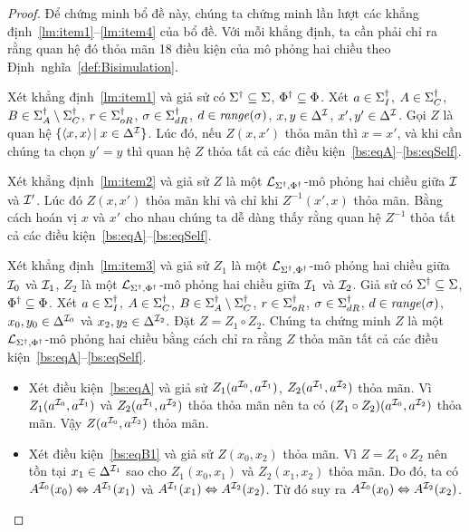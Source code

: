\begin{proof}
	Để chứng minh bổ đề này, chúng ta chứng minh lần lượt các khẳng định~\ref{lm:item1}--\ref{lm:item4} của bổ đề. Với mỗi khẳng định, ta cần phải chỉ ra rằng quan hệ đó thỏa mãn 18 điều kiện của mô phỏng hai chiều theo Định~nghĩa~\ref{def:Bisimulation}.
	
	\semiItem Xét khẳng định~\eqref{lm:item1} và giả sử có $\Sigma^\dag \subseteq \Sigma$, $\Phi^\dag \subseteq \Phi$. Xét $a \in \Sigma^\dag_I$, $A \in \Sigma^\dag_C$, $B \in \Sigma^\dag_A\setminus\Sigma^\dag_C$, $r \in \Sigma^\dag_{oR}$, $\sigma \in \Sigma^\dag_{dR}$, $d \in \mathit{range}(\sigma)$, $x,y \in \Delta^{\mathcal{I}}$, $x',y' \in \Delta^{\mathcal{I}}$.
	Gọi $Z$ là quan hệ $\{\left\langle x,x\right\rangle\! \mid x \in \Delta^{\mathcal{I}}\}$. Lúc đó, nếu $Z(x, x')$ thỏa mãn thì $x = x'$, và khi cần chúng ta chọn $y' = y$ thì quan hệ $Z$ thỏa tất cả các điều kiện~\eqref{bs:eqA}--\eqref{bs:eqSelf}.
	
	\semiItem Xét khẳng định~\eqref{lm:item2} và giả sử $Z$ là một $\mathcal{L}_{\Sigma^\dag,\Phi^\dag}$-mô phỏng hai chiều giữa $\mathcal{I}$ và $\mathcal{I}'$. Lúc đó $Z(x, x')$ thỏa mãn khi và chỉ khi $Z^{-1}(x', x)$ thỏa mãn. Bằng cách hoán vị $x$ và $x'$ cho nhau chúng ta dễ dàng thấy rằng quan hệ $Z^{-1}$ thỏa tất cả các điều kiện~\eqref{bs:eqA}--\eqref{bs:eqSelf}.
	
	\semiItem Xét khẳng định~\eqref{lm:item3} và giả sử $Z_1$ là một $\mathcal{L}_{\Sigma^\dag,\Phi^\dag}$-mô phỏng hai chiều giữa $\mathcal{I}_0$ và $\mathcal{I}_1$, $Z_2$ là một $\mathcal{L}_{\Sigma^\dag,\Phi^\dag}$-mô phỏng hai chiều giữa $\mathcal{I}_1$ và $\mathcal{I}_2$.
	Giả sử có $\Sigma^\dag \subseteq \Sigma$, $\Phi^\dag \subseteq \Phi$. Xét $a \in \Sigma^\dag_I$, $A \in \Sigma^\dag_C$, $B \in \Sigma^\dag_A\setminus\Sigma^\dag_C$, $r \in \Sigma^\dag_{oR}$, $\sigma \in \Sigma^\dag_{dR}$, $d \in \mathit{range}(\sigma)$, $x_0,y_0 \in \Delta^{\mathcal{I}_0}$ và $x_2,y_2 \in \Delta^{\mathcal{I}_2}$. Đặt $Z = Z_1 \circ Z_2$. Chúng ta chứng minh $Z$ là một $\mathcal{L}_{\Sigma^\dag,\Phi^\dag}$-mô phỏng hai chiều bằng cách chỉ ra rằng $Z$ thỏa mãn tất cả các điều kiện~\eqref{bs:eqA}--\eqref{bs:eqSelf}.
	
	\begin{itemize}
		\item Xét điều kiện~\eqref{bs:eqA} và giả sử $Z_1(a^{\mathcal{I}_0}, a^{\mathcal{I}_1})$, $Z_2(a^{\mathcal{I}_1}, a^{\mathcal{I}_2})$ thỏa mãn. Vì $Z_1(a^{\mathcal{I}_0}, a^{\mathcal{I}_1})$ và $Z_2(a^{\mathcal{I}_1}, a^{\mathcal{I}_2})$ thỏa thỏa mãn nên ta có $(Z_1 \circ Z_2)(a^{\mathcal{I}_0}, a^{\mathcal{I}_2})$ thỏa mãn. Vậy $Z(a^{\mathcal{I}_0}, a^{\mathcal{I}_2})$ thỏa mãn.
	
		\item Xét điều kiện~\eqref{bs:eqB1} và giả sử $Z(x_0, x_2)$ thỏa mãn. Vì $Z = Z_1 \circ Z_2$ nên tồn tại $x_1 \in \Delta^{\mathcal{I}_1}$ sao cho $Z_1(x_0, x_1)$ và $Z_2(x_1, x_2)$ thỏa mãn. Do đó, ta có $A^{\mathcal{I}_0}(x_0) \Leftrightarrow A^{\mathcal{I}_1}(x_1)$ và $A^{\mathcal{I}_1}(x_1) \Leftrightarrow A^{\mathcal{I}_2}(x_2)$. Từ đó suy ra $A^{\mathcal{I}_0}(x_0) \Leftrightarrow A^{\mathcal{I}_2}(x_2)$.
	

\end{itemize}
\end{proof}
